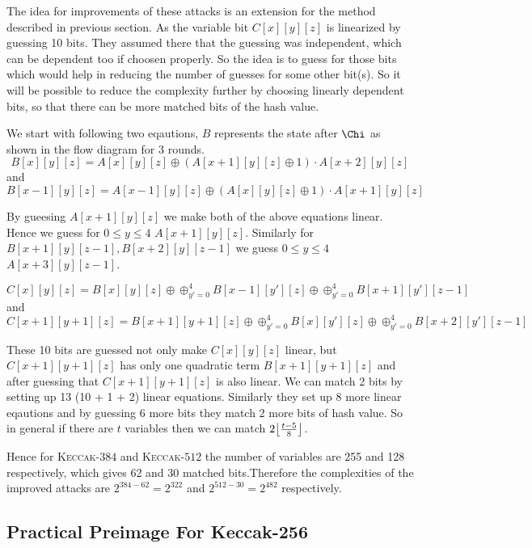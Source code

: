 \documentclass[runningheads]{llncs}
\DeclarePairedDelimiter\floor{\lfloor}{\rfloor}
\newcommand{\KECCAK}{\mbox{\textsc{Keccak}}}
\begin{document}
    The idea for improvements of these attacks is an extension for the method described in previous section. As the variable bit $C[x][y][z]$ is linearized by guessing 10 bits. They assumed there that the guessing was independent, which can be dependent too if choosen properly. So the idea is to guess for those bits which would help in reducing the number of guesses for some other bit(s). So it will be possible to reduce the complexity further by choosing linearly dependent bits, so that there can be more matched bits of the hash value.

		We start with following two eqautions, $B$ represents the state after $\Chi$ as shown in the flow diagram for 3 rounds.
		\[
			B[x][y][z] = A[x][y][z] \oplus (A[x+1][y][z] \oplus 1) \cdot A[x+2][y][z]
		\] and
		\[
			B[x-1][y][z] = A[x-1][y][z] \oplus (A[x][y][z] \oplus 1) \cdot A[x+1][y][z]
		\]

		By gueesing $A[x+1][y][z]$ we make both of the above equations linear. Hence we guess for $0 \leq y \leq 4$ $A[x+1][y][z]$. Similarly for $B[x+1][y][z-1], B[x+2][y][z-1]$ we guess $0 \leq y \leq 4$ $A[x+3][y][z-1]$. 
		
		\[
        C[x][y][z] = B[x][y][z] \oplus \oplus_{y' = 0}^{4} B[x-1][y'][z] \oplus \oplus_{y' = 0}^{4} B[x+1][y'][z-1]
    \] and 
		\[
        C[x+1][y+1][z] = B[x+1][y+1][z] \oplus \oplus_{y' = 0}^{4} B[x][y'][z] \oplus \oplus_{y' = 0}^{4} B[x+2][y'][z-1]
    \]

		These 10 bits are guessed not only make $C[x][y][z]$ linear, but $C[x+1][y+1][z]$ has only one quadratic term $B[x+1][y+1][z]$ and after guessing that $C[x+1][y+1][z]$ is also linear. We can match 2 bits by setting up 13 (10 + 1 + 2) linear equations. Similarly they set up 8 more linear eqautions and by guessing 6 more bits they match 2 more bits of hash value. So in general if there are $t$ variables then we can match $ 2\floor*{\frac{t-5}{8}}$.

		Hence for \KECCAK-$384$ and \KECCAK-$512$ the number of variables are 255 and 128 respectively, which gives 62 and 30 matched bits.Therefore the complexities of the improved attacks are $2^{384 - 62} = 2^{322}$ and $2^{512 - 30} = 2^{482}$ respectively.

\subsection{Practical Preimage For Keccak-256}
\end{document}
